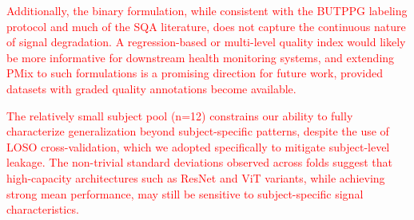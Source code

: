 \documentclass[final,3p,times,twocolumn]{elsarticle}
\newcommand{\red}[1]{\textcolor{red}{#1}}
\begin{document}
\red{Additionally, the binary formulation, while consistent with the \gls{BUTPPG} labeling protocol and much of the \gls{SQA} literature, does not capture the continuous nature of signal degradation. A regression-based or multi-level quality index would likely be more informative for downstream health monitoring systems, and extending \gls{PMix} to such formulations is a promising direction for future work, provided datasets with graded quality annotations become available.}



\red{The relatively small subject pool (n=12) constrains our ability to fully characterize generalization beyond subject-specific patterns, despite the use of \gls{LOSO} cross-validation, which we adopted specifically to mitigate subject-level leakage. The non-trivial standard deviations observed across folds suggest that high-capacity architectures such as ResNet and \gls{ViT} variants, while achieving strong mean performance, may still be sensitive to subject-specific signal characteristics.}

\end{document}

